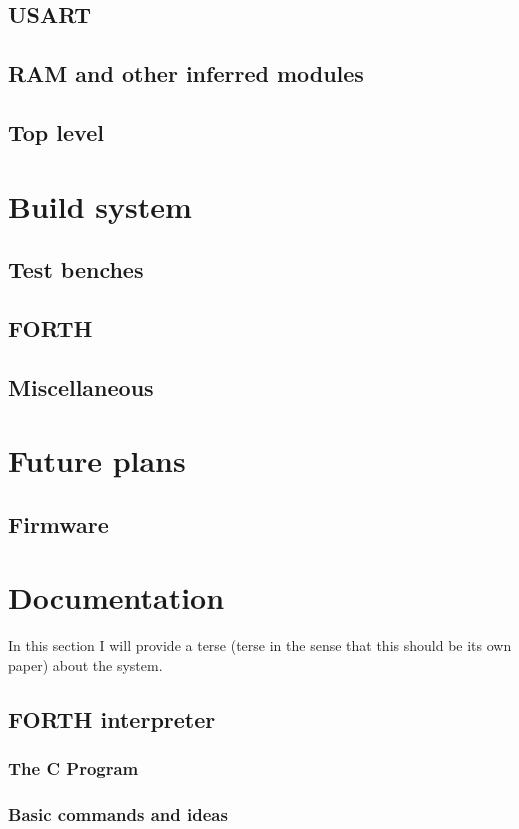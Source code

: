 \documentclass	[a4paper, 10pt]	{article}
\begin{document}
    \subsection{USART}
    \subsection{RAM and other inferred modules}
    \subsection{Top level}
  \section{Build system}
    \subsection{Test benches}
    \subsection{FORTH}
    \subsection{Miscellaneous}
  \section{Future plans}
    \subsection{Firmware}
  \section{Documentation}

  In this section I will provide a terse (terse in the sense that this should
  be its own paper) about the system.

    \subsection{FORTH interpreter}
      \subsubsection{The C Program}
      \subsubsection{Basic commands and ideas}
\end{document}
